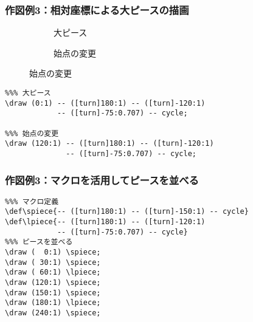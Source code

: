 \documentclass{beamer}
\def\lpiece{-- ([turn]180:1) -- ([turn]-120:1) -- ([turn]-75:0.707) -- cycle}
\def\spiece{-- ([turn]180:1) -- ([turn]-150:1) -- cycle}
\begin{document}
\begin{frame}[fragile=singleslide]
    \frametitle{作図例3：相対座標による大ピースの描画}

    \begin{figure}
        \begin{subfigure}{0.28\columnwidth}
            \centering
            \caption{大ピース}
        \end{subfigure}
        \begin{subfigure}{0.28\columnwidth}
            \centering
            \caption{始点の変更}
        \end{subfigure}
    \end{figure}

    \begin{verbatim}
%%% 大ピース
\draw (0:1) -- ([turn]180:1) -- ([turn]-120:1)
            -- ([turn]-75:0.707) -- cycle;

%%% 始点の変更
\draw (120:1) -- ([turn]180:1) -- ([turn]-120:1)
              -- ([turn]-75:0.707) -- cycle;
    \end{verbatim}
\end{frame}

\begin{frame}[fragile=singleslide]
    \frametitle{作図例3：マクロを活用してピースを並べる}

    \begin{figure}
    \end{figure}

    \begin{verbatim}
%%% マクロ定義
\def\spiece{-- ([turn]180:1) -- ([turn]-150:1) -- cycle}
\def\lpiece{-- ([turn]180:1) -- ([turn]-120:1)
            -- ([turn]-75:0.707) -- cycle}
%%% ピースを並べる
\draw (  0:1) \spiece;
\draw ( 30:1) \spiece;
\draw ( 60:1) \lpiece;
\draw (120:1) \spiece;
\draw (150:1) \spiece;
\draw (180:1) \lpiece;
\draw (240:1) \spiece;
    \end{verbatim}
\end{frame}
\end{document}
